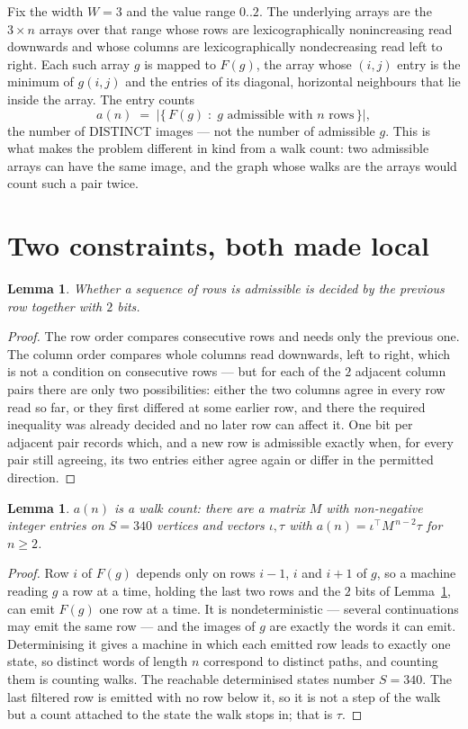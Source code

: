 \documentclass[11pt,a4paper]{article}
\theoremstyle{plain}
\newtheorem{lemma}[theorem]{Lemma}
\theoremstyle{definition}
\begin{document}
Fix the width $W=3$ and the value range $0..2$. The underlying arrays are the
$3\times n$ arrays over that range whose rows are lexicographically nonincreasing read downwards
and whose columns are lexicographically nondecreasing read left to right. Each such array $g$
is mapped to $F(g)$, the array whose $(i,j)$ entry is the minimum of $g(i,j)$ and the entries
of its diagonal, horizontal neighbours that lie inside the array. The entry counts
\[
a(n)\;=\;\bigl|\{\,F(g)\;:\;g\text{ admissible with }n\text{ rows}\,\}\bigr|,
\]
the number of DISTINCT images --- not the number of admissible $g$. This is what makes the
problem different in kind from a walk count: two admissible arrays can have the same image, and
the graph whose walks are the arrays would count such a pair twice.

\section{Two constraints, both made local}

\begin{lemma}\label{lem:local}
Whether a sequence of rows is admissible is decided by the previous row together with
$2$ bits.
\end{lemma}

\begin{proof}
The row order compares consecutive rows and needs only the previous one. The column order
compares whole columns read downwards, left to right, which is not a condition on consecutive
rows --- but for each of the $2$ adjacent column pairs there are only two possibilities:
either the two columns agree in every row read so far, or they first differed at some earlier
row, and there the required inequality was already decided and no later row can affect it. One
bit per adjacent pair records which, and a new row is admissible exactly when, for every pair
still agreeing, its two entries either agree again or differ in the permitted direction.
\end{proof}

\begin{lemma}\label{lem:det}
$a(n)$ is a walk count: there are a matrix $M$ with non-negative integer entries on $S=340$
vertices and vectors $\iota,\tau$ with $a(n)=\iota^{\!\top}M^{\,n-2}\tau$ for $n\ge2$.
\end{lemma}

\begin{proof}
Row $i$ of $F(g)$ depends only on rows $i-1$, $i$ and $i+1$ of $g$, so a machine reading $g$ a
row at a time, holding the last two rows and the $2$ bits of Lemma~\ref{lem:local}, can
emit $F(g)$ one row at a time. It is nondeterministic --- several continuations may emit the
same row --- and the images of $g$ are exactly the words it can emit. Determinising it gives a
machine in which each emitted row leads to exactly one state, so distinct words of length $n$
correspond to distinct paths, and counting them is counting walks. The reachable determinised
states number $S=340$. The last filtered row is emitted with no row below it, so it is not a
step of the walk but a count attached to the state the walk stops in; that is $\tau$.
\end{proof}
\end{document}
